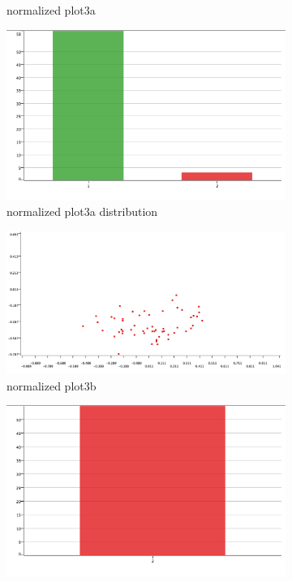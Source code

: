 \documentclass[11pt]{article}
\begin{document}
\begin{figure}[H]
\begin{subfigure}{0.3\textwidth}
					\caption{normalized plot3a}
					\label{fig:first}
				\end{subfigure}
				\hfill
				\begin{subfigure}{0.3\textwidth}
					\includegraphics[width=\textwidth]{res/t2/t24/t24-plot23a-dist}
					\caption{normalized plot3a distribution}
					\label{fig:second}
				\end{subfigure}
				\hfill
				\begin{subfigure}{0.3\textwidth}
					\includegraphics[width=\textwidth]{res/t2/t24/t24-plot23b}
					\caption{normalized plot3b}
					\label{fig:first}
				\end{subfigure}
				\hfill
				\begin{subfigure}{0.3\textwidth}
					\includegraphics[width=\textwidth]{res/t2/t24/t24-plot23b-dist}

\end{subfigure}
\end{figure}
\end{document}
